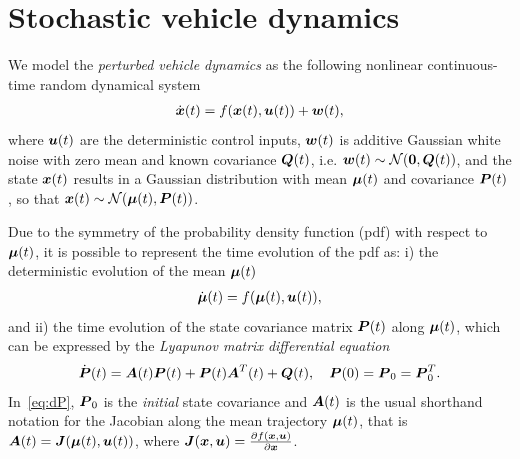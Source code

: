 \section{Stochastic vehicle dynamics}
\label{sec:stochastic_vehicle_dynamics} 

We model the \emph{perturbed vehicle dynamics} as the following nonlinear continuous-time random dynamical system
\begin{align}
\dot{\boldsymbol{x}}(t) = f(\boldsymbol{x}(t), \boldsymbol{u}(t)) + \boldsymbol{w}(t),
\end{align}
where $\boldsymbol{u}(t)$ are the deterministic control inputs, $\boldsymbol{w}(t)$ is additive Gaussian white noise with zero mean and known covariance $\boldsymbol{Q}(t)$, i.e. $\boldsymbol{w}(t) \sim \mathcal{N}(\boldsymbol{0}, \boldsymbol{Q}(t))$, and the state $\boldsymbol{x}(t)$ results in a Gaussian distribution with mean $\boldsymbol{\mu}(t)$ and covariance $\boldsymbol{P}(t)$, so that $\boldsymbol{x}(t) \sim \mathcal{N}(\boldsymbol{\mu}(t), \boldsymbol{P}(t))$.

Due to the symmetry of the probability density function (pdf) with respect to $\boldsymbol{\mu}(t)$, it is possible to represent the time evolution of the pdf as: i) the deterministic evolution of the mean $\boldsymbol{\mu}(t)$
\begin{align}\label{eq:meandynamics}
\dbmu(t) = f(\bmu(t), \bu(t)),
\end{align}
and ii) the time evolution of the state covariance matrix $\boldsymbol{P}(t)$ along $\boldsymbol{\mu}(t)$, which can be expressed by the \emph{Lyapunov matrix differential equation}
\begin{align}\label{eq:dP}
\dbP(t) = \bA(t) \bP(t) + \bP(t) \bA^T(t) + \bQ(t),\quad \bP(0) = \bP_0 = \bP_0^T.
\end{align}
In~\eqref{eq:dP}, $\boldsymbol{P}_0$ is the \emph{initial} state covariance and $\boldsymbol{A}(t)$ is the usual shorthand notation for the Jacobian along the mean trajectory $\boldsymbol{\mu}(t)$, that is $\boldsymbol{A}(t)=\boldsymbol{J}(\boldsymbol{\mu}(t),\boldsymbol{u}(t))$, where $\boldsymbol{J}(\boldsymbol{x}, \boldsymbol{u}) = \frac{\partial f(\boldsymbol{x}, \boldsymbol{u})}{\partial \boldsymbol{x}}$.

